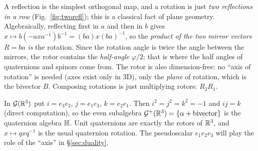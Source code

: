 

\begin{intuition}
A reflection is the simplest orthogonal map, and a rotation is just \emph{two reflections in a row} (Fig.~\ref{fig:tworefl}); this is a classical fact of plane geometry.
Algebraically, reflecting first in $a$ and then in $b$ gives $x\mapsto b(-axa^{-1})b^{-1}=(ba)x(ba)^{-1}$, so the \emph{product of the two mirror vectors} $R=ba$ \emph{is} the rotation.
Since the rotation angle is twice the angle between the mirrors, the rotor contains the \emph{half-angle} $\varphi/2$; that is where the half angles of quaternions and spinors come from. The rotor is also dimension-free: no ``axis of rotation'' is needed (axes exist only in $3$D), only the \emph{plane} of rotation, which is the bivector $B$. Composing rotations is just multiplying rotors: $R_2R_1$.
\end{intuition}

\begin{example}
In $\mathcal{G}(\mathbb{R}^3)$ put $i=e_3e_2$, $j=e_1e_3$, $k=e_2e_1$. Then $i^2=j^2=k^2=-1$ and $ij=k$ (direct computation), so the even subalgebra $\mathcal{G}^+(\mathbb{R}^3)=\{\alpha+\text{bivector}\}$ is the quaternion algebra $\mathbb{H}$. Unit quaternions are exactly the rotors of $\mathbb{R}^3$, and $x\mapsto qxq^{-1}$ is the usual quaternion rotation. The pseudoscalar $e_1e_2e_3$ will play the role of the ``axis'' in \S\ref{sec:duality}.
\end{example}
